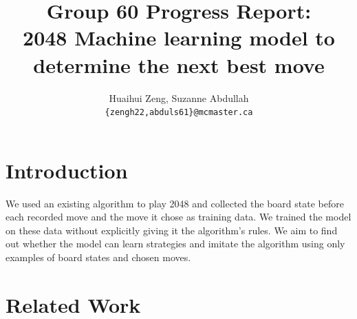 \documentclass[11pt]{article}
\title{Group 60 Progress Report:\\2048 Machine learning model to determine the next best move}
\author{Huaihui Zeng, Suzanne Abdullah\\
  \texttt{\{zengh22,abduls61\}@mcmaster.ca} }
\begin{document}
\maketitle

\section{Introduction}


We used an existing algorithm to play 2048 and collected the board state before each recorded move and the move it chose as training data. We trained the model on these data without explicitly giving it the algorithm's rules. We aim to find out whether the model can learn strategies and imitate the algorithm using only examples of board states and chosen moves.

\section{Related Work}
\end{document}
